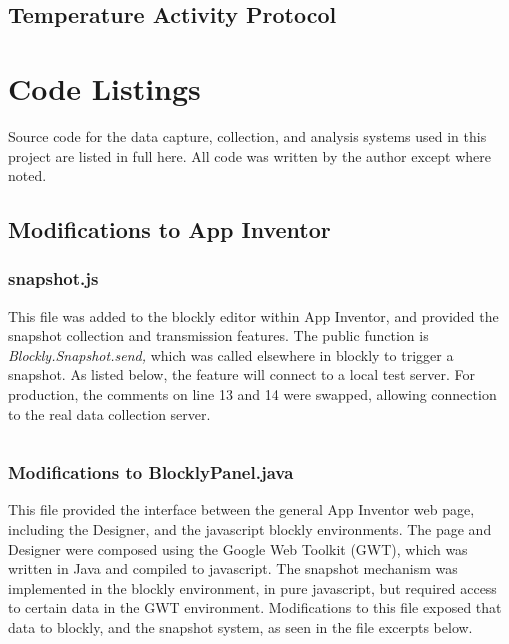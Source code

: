 \section{Temperature Activity Protocol}

\label{sec:IRB:temperature}




\chapter{Code Listings}
Source code for the data capture, collection, and analysis systems used in this project are listed in full here. All code was written by the author except where noted.


\section{Modifications to App Inventor}
\label{src:appinventor}

\subsection{snapshot.js}
\label{src:ai/snapshot.js}
This file was added to the blockly editor within App Inventor, and provided the snapshot collection and transmission features. The public function is \emph{Blockly.Snapshot.send,} which was called elsewhere in blockly to trigger a snapshot. As listed below, the feature will connect to a local test server. For production, the comments on line 13 and 14 were swapped, allowing connection to the real data collection server. 
\inputminted{javascript}{src/appinventor/snapshot.js}

\subsection{Modifications to BlocklyPanel.java}
\label{src:ai/BlocklyPanel.java}
This file provided the interface between the general App Inventor web page, including the Designer, and the javascript blockly environments. The page and Designer were composed using the Google Web Toolkit (GWT), which was written in Java and compiled to javascript. The snapshot mechanism was implemented in the blockly environment, in pure javascript, but required access to certain data in the GWT environment. Modifications to this file exposed that data to blockly, and the snapshot system, as seen in the file excerpts below.

